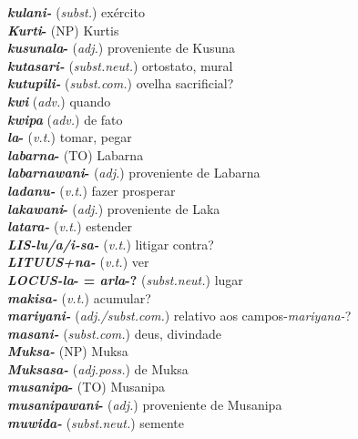 \begin{multicols}{2}
\begin{hangparas}{1em}{1}
		\textbf{\emph{kulani-}} (\emph{subst.}) \tabto{1em} exército\\
		\textbf{\emph{Kurti}-} (NP) \tabto{1em} Kurtis\\
		\textbf{\emph{kusunala}-} (\emph{adj.}) \tabto{1em} proveniente de Kusuna\\
		\textbf{\emph{kutasari-}} (\emph{subst.neut.}) \tabto{1em} ortostato, mural\\
		\columnbreak%
		\textbf{\emph{kutupili-}} (\emph{subst.com.}) \tabto{1em} ovelha sacrificial?\\
		\textbf{\emph{kwi}} (\emph{adv.}) \tabto{1em} quando\\
		\textbf{\emph{kwipa}} (\emph{adv.}) \tabto{1em} de fato\\
		\textbf{\emph{la}-} (\emph{v.t.}) \tabto{1em} tomar, pegar\\
		\textbf{\emph{labarna}-} (TO) \tabto{1em} Labarna \\
		\textbf{\emph{labarnawani}-} (\emph{adj.}) \tabto{1em} proveniente de Labarna\\
		\textbf{\emph{ladanu-}} (\emph{v.t.}) \tabto{1em} fazer prosperar\\
		\textbf{\emph{lakawani}-} (\emph{adj.}) \tabto{1em} proveniente de Laka\\
		\textbf{\emph{latara-}} (\emph{v.t.}) \tabto{1em} estender\\
		\textbf{\emph{\emph{LIS}-lu/a/i-sa-}} (\emph{v.t.}) \tabto{1em} litigar contra?\\
		\textbf{\emph{\emph{LITUUS}+na-}} (\emph{v.t.}) \tabto{1em} ver\\
		\textbf{\emph{\emph{LOCUS}-la}- = \emph{arla}-?} (\emph{subst.neut.}) \tabto{1em} lugar\\
		\textbf{\emph{makisa-}} (\emph{v.t.}) \tabto{1em} acumular?\\
		\textbf{\emph{mariyani-}} (\emph{adj./subst.com.}) \tabto{1em} relativo aos campos-\emph{mariyana-}?\\
		\textbf{\emph{masani-}} (\emph{subst.com.}) \tabto{1em} deus, divindade\\
		\textbf{\emph{Muksa-}} (NP) \tabto{1em} Muksa\\
		\textbf{\emph{Muksasa-}} (\emph{adj.poss.}) \tabto{1em} de Muksa\\
		\textbf{\emph{musanipa}-} (TO) \tabto{1em} Musanipa\\
		\textbf{\emph{musanipawani}-} (\emph{adj.}) \tabto{1em} proveniente de Musanipa\\
		\textbf{\emph{muwida-}} (\emph{subst.neut.}) \tabto{1em} semente\\

\end{hangparas}
\end{multicols}
